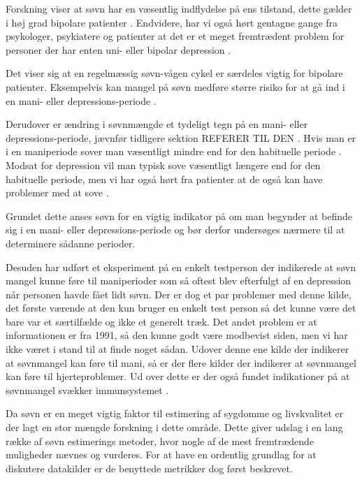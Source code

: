 Forskning viser at søvn har en væsentlig indflydelse på ens tilstand, dette gælder i høj grad bipolare patienter \citep{CPSP:CPSP1164}.
Endvidere, har vi også hørt gentagne gange fra psykologer, psykiatere og patienter at det er et meget fremtrædent problem for personer der har enten uni- eller bipolar depression \citep[Kapitel 2, Sektion 3,4,5]{misc:faellesrapp}.

Det viser sig at en regelmæssig søvn-vågen cykel er særdeles vigtig for bipolare patienter.
Eksempelvis kan mangel på søvn medføre større risiko for at gå ind i en mani- eller depressions-periode \citep{CPSP:CPSP1164}.

Derudover er ændring i søvnmængde et tydeligt tegn på en mani- eller depressions-periode, jævnfør tidligere sektion REFERER TIL DEN .
Hvis man er i en maniperiode sover man væsentligt mindre end for den habituelle periode \citep{CPSP:CPSP1164}.
Modsat for depression vil man typisk sove væsentligt længere end for den habituelle periode, men vi har også hørt fra patienter at de også kan have problemer med at sove \citep[Kapitel 2, Sektion 5]{misc:faellesrapp}.

Grundet dette anses søvn for en vigtig indikator på om man begynder at befinde sig i en mani- eller depressions-periode og bør derfor undersøges nærmere til at determinere sådanne perioder.

Desuden har \citet{art:sleepCusMania} udført et eksperiment på en enkelt testperson der indikerede at søvn mangel kunne føre til maniperioder som så oftest blev efterfulgt af en depression når personen havde fået lidt søvn.
Der er dog et par problemer med denne kilde, det første værende at den kun bruger en enkelt test person så det kunne være det bare var et særtilfælde og ikke et generelt træk.
Det andet problem er at informationen er fra 1991, så den kunne godt være modbevist siden, men vi har ikke været i stand til at finde noget sådan.
Udover denne ene kilde der indikerer at søvnmangel kan føre til mani, så er der flere kilder \citep{Mullington2009294,art:sleeplossHeart} der indikerer at søvnmangel kan føre til hjerteproblemer.
Ud over dette er der også fundet indikationer på at søvnmangel svækker immunsystemet \citep{misc:sleepImmune}.

Da søvn er en meget vigtig faktor til estimering af sygdomme og livskvalitet er der lagt en stor mængde forskning i dette område.
Dette giver udslag i en lang række af søvn estimerings metoder, hvor nogle af de mest fremtrædende muligheder nævnes og vurderes.
For at have en ordentlig grundlag for at diskutere datakilder er de benyttede metrikker dog først beskrevet.

